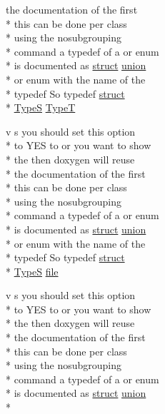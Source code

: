 \begin{DoxyCompactItemize}
the documentation of the first \\*
this can be done per class \\*
using the nosubgrouping \\*
command a typedef of a or enum \\*
is documented as \hyperlink{mkdoc_8dox_aba655c5729da86df745f0c8e7f9ba8d2}{struct} \hyperlink{mkdoc_8dox_a68000add3c95d09ceb97c3079515907d}{union} \\*
or enum with the name of the \\*
typedef So typedef \hyperlink{mkdoc_8dox_aba655c5729da86df745f0c8e7f9ba8d2}{struct} \\*
\hyperlink{mkdoc_8dox_a25dd1c015abaf1e4f2c6879012f4f170}{Type\-S} \hyperlink{mkdoc_8dox_a75f821103190ea93dfc4c1a779ddc9f7}{Type\-T}
\item 
v s you should set this option \\*
to Y\-E\-S to or you want to show \\*
the then doxygen will reuse \\*
the documentation of the first \\*
this can be done per class \\*
using the nosubgrouping \\*
command a typedef of a or enum \\*
is documented as \hyperlink{mkdoc_8dox_aba655c5729da86df745f0c8e7f9ba8d2}{struct} \hyperlink{mkdoc_8dox_a68000add3c95d09ceb97c3079515907d}{union} \\*
or enum with the name of the \\*
typedef So typedef \hyperlink{mkdoc_8dox_aba655c5729da86df745f0c8e7f9ba8d2}{struct} \\*
\hyperlink{mkdoc_8dox_a25dd1c015abaf1e4f2c6879012f4f170}{Type\-S} \hyperlink{mkdoc_8dox_a049a073e5602cc325f7559a06c5a2420}{file}
\item 
v s you should set this option \\*
to Y\-E\-S to or you want to show \\*
the then doxygen will reuse \\*
the documentation of the first \\*
this can be done per class \\*
using the nosubgrouping \\*
command a typedef of a or enum \\*
is documented as \hyperlink{mkdoc_8dox_aba655c5729da86df745f0c8e7f9ba8d2}{struct} \hyperlink{mkdoc_8dox_a68000add3c95d09ceb97c3079515907d}{union} \\*

\end{DoxyCompactItemize}
